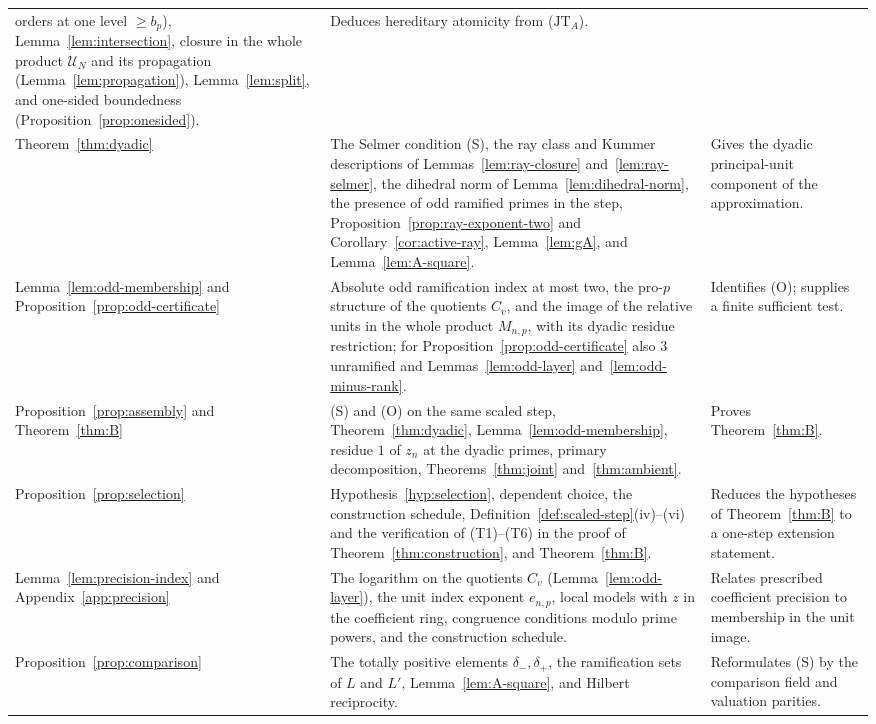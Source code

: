 \documentclass[11pt]{article}
\theoremstyle{plain}
\theoremstyle{definition}
\theoremstyle{remark}
\begin{document}
\begin{longtable}{@{}>{\raggedright\arraybackslash}p{}>{\raggedright\arraybackslash}p{}>{\raggedright\arraybackslash}p{}@{}}
orders at one level $\ge b_p$), Lemma~\ref{lem:intersection}, closure in the whole product $\mathcal U_N$ and its propagation
(Lemma~\ref{lem:propagation}), Lemma~\ref{lem:split}, and one-sided
boundedness (Proposition~\ref{prop:onesided}). &
Deduces hereditary atomicity from \textup{($\mathrm{JT}_A$)}.\\[4pt]
Theorem~\ref{thm:dyadic} &
The Selmer condition (S), the ray class and Kummer descriptions of
Lemmas~\ref{lem:ray-closure} and~\ref{lem:ray-selmer}, the dihedral norm
of Lemma~\ref{lem:dihedral-norm}, the presence of odd ramified primes in
the step, Proposition~\ref{prop:ray-exponent-two} and
Corollary~\ref{cor:active-ray}, Lemma~\ref{lem:gA}, and
Lemma~\ref{lem:A-square}. &
Gives the dyadic principal-unit component of the approximation.\\[4pt]
Lemma~\ref{lem:odd-membership} and
Proposition~\ref{prop:odd-certificate} &
Absolute odd ramification index at most two, the pro-$p$ structure of
the quotients $C_v$, and
the image of the relative units in the whole product $M_{n,p}$, with its
dyadic residue restriction; for Proposition~\ref{prop:odd-certificate}
also $3$ unramified and Lemmas~\ref{lem:odd-layer}
and~\ref{lem:odd-minus-rank}. &
Identifies (O); supplies a finite sufficient test.\\[4pt]
Proposition~\ref{prop:assembly} and Theorem~\ref{thm:B} &
(S) and (O) on the same scaled step, Theorem~\ref{thm:dyadic},
Lemma~\ref{lem:odd-membership}, residue $1$ of $z_n$ at the dyadic
primes, primary decomposition, Theorems~\ref{thm:joint}
and~\ref{thm:ambient}. &
Proves Theorem~\ref{thm:B}.\\[4pt]
Proposition~\ref{prop:selection} &
Hypothesis~\ref{hyp:selection}, dependent choice, the construction
schedule, Definition~\ref{def:scaled-step}(iv)--(vi) and the
verification of \textup{(T1)--(T6)} in the proof of
Theorem~\ref{thm:construction}, and
Theorem~\ref{thm:B}. &
Reduces the hypotheses of Theorem~\ref{thm:B} to a one-step extension
statement.\\[4pt]
Lemma~\ref{lem:precision-index} and
Appendix~\ref{app:precision} &
The logarithm on the quotients $C_v$ (Lemma~\ref{lem:odd-layer}), the
unit index exponent $e_{n,p}$, local models with $z$ in the coefficient
ring, congruence conditions modulo prime powers, and the construction
schedule. &
Relates prescribed coefficient precision to membership in the unit
image.\\[4pt]
Proposition~\ref{prop:comparison} &
The totally positive elements $\delta_-,\delta_+$, the ramification
sets of $L$ and $L'$, Lemma~\ref{lem:A-square}, and Hilbert reciprocity. &
Reformulates (S) by the comparison field and valuation parities.\\
\bottomrule
\end{longtable}
\end{document}
